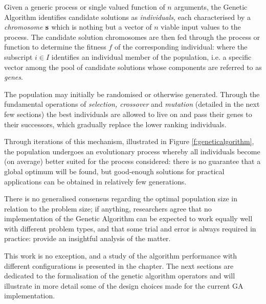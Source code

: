 Given a generic process or single valued function of $n$ arguments, the Genetic Algorithm identifies candidate solutions as \emph{individuals}, each characterised by a \emph{chromosome} $\mathbf{s}$ which is nothing but a vector of $n$ viable input values to the process. The candidate solution chromosomes are then fed through the process or function to determine the fitness $f$ of the corresponding individual:
where the subscript $i \in I$ identifies an individual member of the population, i.e. a specific vector among the pool of candidate solutions whose components are referred to as \emph{genes}.

The population may initially be randomised or otherwise generated. Through the fundamental operations of \emph{selection, crossover} and \emph{mutation} (detailed in the next few sections) the best individuals are allowed to live on and pass their genes to their successors, which gradually replace the lower ranking individuals.


Through iterations of this mechanism, illustrated in Figure \ref{f:geneticalgorithm}, the population undergoes an evolutionary process whereby all individuals become (on average) better suited for the process considered: there is no guarantee that a global optimum will be found, but good-enough solutions for practical applications can be obtained in relatively few generations. 

There is no generalised consensus regarding the optimal population size in relation to the problem size; if anything, researchers agree that no implementation of the Genetic Algorithm can be expected to work equally well with different problem types, and that some trial and error is always required in practice: \citep{eberhart1998comparison} provide an insightful analysis of the matter.

This work is no exception, and a study of the algorithm performance with different configurations is presented in the  chapter. The next sections are dedicated to the formalisation of the genetic algorithm operators and will illustrate in more detail some of the design choices made for the current GA implementation.

